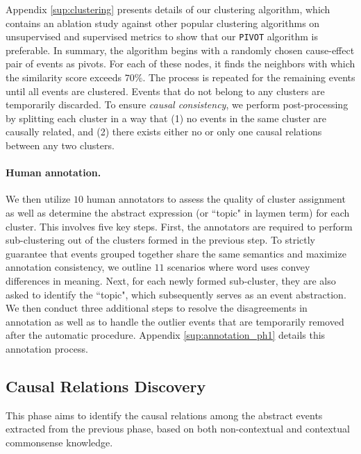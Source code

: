 Appendix \ref{sup:clustering} presents details of our clustering algorithm, which contains an ablation study against other popular clustering algorithms on unsupervised and supervised metrics to show that our \texttt{PIVOT} algorithm is preferable. In summary, the algorithm begins with a randomly chosen cause-effect pair of events as pivots. For each of these nodes, it finds the neighbors with which the similarity score exceeds $70\%$. The process is repeated for the remaining events until all events are clustered. Events that do not belong to any clusters are temporarily discarded. To ensure \textit{causal consistency}, we perform post-processing by splitting each cluster in a way that (1) no events in the same cluster are causally related, and (2) there exists either no or only one causal relations between any two clusters. 


\paragraph{Human annotation.} We then utilize $10$ human annotators to assess the quality of cluster assignment as well as determine the abstract expression (or ``topic" in laymen term) for each cluster. This involves five key steps. First, the annotators are required to perform sub-clustering out of the clusters formed in the previous step. To strictly guarantee that events grouped together share the same semantics and maximize annotation consistency, we outline $11$ scenarios where word uses convey differences in meaning. Next, for each newly formed sub-cluster, they are also asked to identify the ``topic", which subsequently serves as an event abstraction. We then conduct three additional steps to resolve the disagreements in annotation as well as to handle the outlier events that are temporarily removed after the automatic procedure. Appendix \ref{sup:annotation_ph1} details this annotation process.

\subsection{Causal Relations Discovery}
This phase aims to identify the causal relations among the abstract events extracted from the previous phase, based on both non-contextual and contextual commonsense knowledge.  


